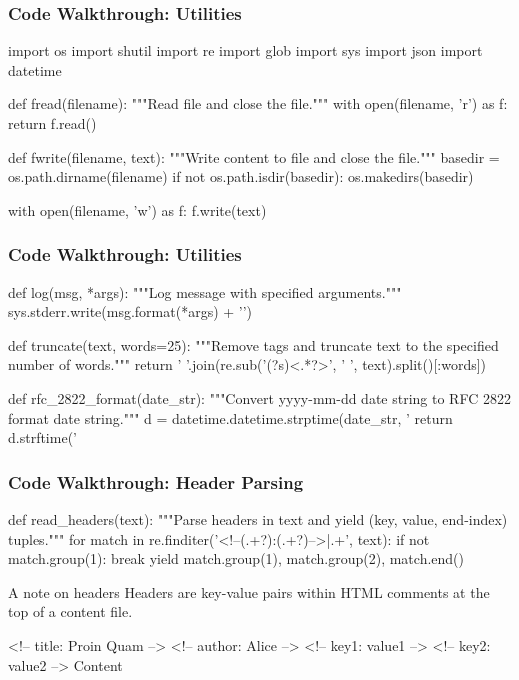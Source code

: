 \documentclass{beamer}
\begin{document}
\begin{frame}[fragile]
\frametitle{Code Walkthrough: Utilities}
\begin{pythoncode}
import os
import shutil
import re
import glob
import sys
import json
import datetime

def fread(filename):
    """Read file and close the file."""
    with open(filename, 'r') as f:
        return f.read()


def fwrite(filename, text):
    """Write content to file and close the file."""
    basedir = os.path.dirname(filename)
    if not os.path.isdir(basedir):
        os.makedirs(basedir)

    with open(filename, 'w') as f:
        f.write(text)
\end{pythoncode}
\end{frame}


\begin{frame}[fragile]
\frametitle{Code Walkthrough: Utilities}
\begin{pythoncode}
def log(msg, *args):
    """Log message with specified arguments."""
    sys.stderr.write(msg.format(*args) + '\n')


def truncate(text, words=25):
    """Remove tags and truncate text to the specified number of words."""
    return ' '.join(re.sub('(?s)<.*?>', ' ', text).split()[:words])


def rfc_2822_format(date_str):
    """Convert yyyy-mm-dd date string to RFC 2822 format date string."""
    d = datetime.datetime.strptime(date_str, '%
    return d.strftime('%
\end{pythoncode}
\end{frame}


\begin{frame}[fragile]
\frametitle{Code Walkthrough: Header Parsing}
\begin{pythoncode}
def read_headers(text):
    """Parse headers in text and yield (key, value, end-index) tuples."""
    for match in re.finditer('\s*<!--\s*(.+?)\s*:\s*(.+?)\s*-->\s*|.+', text):
        if not match.group(1):
            break
        yield match.group(1), match.group(2), match.end()
\end{pythoncode}

\begin{block}{A note on headers}
Headers are key-value pairs within HTML comments at the top of a content
file.

\medskip

\begin{contentcode}
<!-- title: Proin Quam -->
<!-- author: Alice -->
<!-- key1: value1 -->
<!-- key2: value2 -->
Content
\end{contentcode}
\end{block}
\end{frame}
\end{document}
